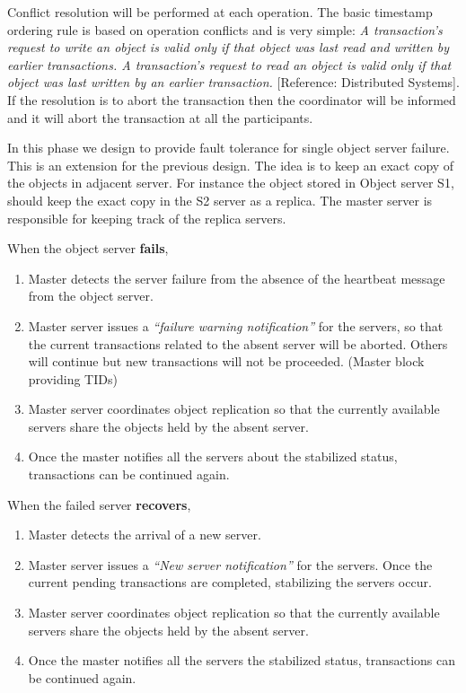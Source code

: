 \documentclass[times, 10pt,twocolumn]{article}
\begin{document}
Conflict resolution will be performed at each operation.
The basic timestamp ordering rule is based on operation conflicts and is very simple:
{\it A transaction’s request to write an object is valid only if that object was last read and written by earlier transactions. A transaction’s request to read an object is valid only if that object was last written by an earlier transaction.} [Reference: Distributed Systems].
If the resolution is to abort the transaction then the coordinator will be informed and it will abort the transaction at all the participants.

\label{subsec:faultol}
In this phase we design to provide fault tolerance for single object server failure. This is an extension for the previous design. The idea is to keep an exact copy of the objects in adjacent server.
For instance the object stored in Object server S1, should keep the exact copy in the S2 server as a replica. The master server is responsible for keeping track of the replica servers.

When the object server {\bf fails},
\begin{enumerate}
\item Master detects the server failure from the absence of the heartbeat message from the object server.
\item Master server issues a {\it “failure warning notification”} for the servers, so that the current transactions related to the absent server will be aborted.
Others will continue but new transactions will not be proceeded. (Master block providing TIDs)
\item Master server coordinates object replication so that the currently available servers share the objects held by the absent server.
\item Once the master notifies all the servers about the stabilized status, transactions can be continued again.
\end{enumerate}

When the failed server {\bf recovers},
\begin{enumerate}
\item Master detects the arrival of a new server.
\item Master server issues a {\it “New server notification”} for the servers. Once the current pending transactions are completed, stabilizing the servers occur.
\item Master server coordinates object replication so that the currently available servers share the objects held by the absent server.
\item Once the master notifies all the servers the stabilized status, transactions can be continued again.
\end{enumerate}
\end{document}
